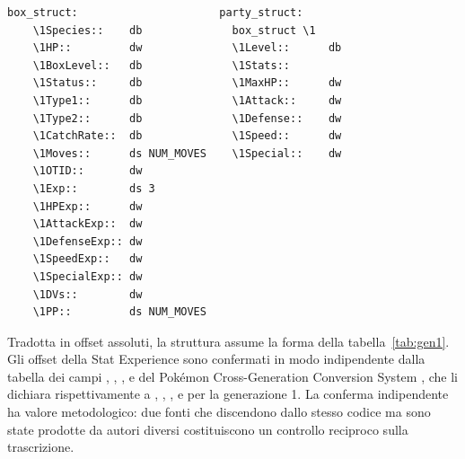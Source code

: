 \begin{verbatim}
box_struct:                      party_struct:
    \1Species::    db              box_struct \1
    \1HP::         dw              \1Level::      db
    \1BoxLevel::   db              \1Stats::
    \1Status::     db              \1MaxHP::      dw
    \1Type1::      db              \1Attack::     dw
    \1Type2::      db              \1Defense::    dw
    \1CatchRate::  db              \1Speed::      dw
    \1Moves::      ds NUM_MOVES    \1Special::    dw
    \1OTID::       dw
    \1Exp::        ds 3
    \1HPExp::      dw
    \1AttackExp::  dw
    \1DefenseExp:: dw
    \1SpeedExp::   dw
    \1SpecialExp:: dw
    \1DVs::        dw
    \1PP::         ds NUM_MOVES
\end{verbatim}

Tradotta in offset assoluti, la struttura assume la forma della tabella~\ref{tab:gen1}. Gli offset della Stat Experience sono confermati in modo indipendente dalla tabella dei campi , , ,  e  del Pokémon Cross-Generation Conversion System \cite{pccs}, che li dichiara rispettivamente a , , ,  e  per la generazione 1. La conferma indipendente ha valore metodologico: due fonti che discendono dallo stesso codice ma sono state prodotte da autori diversi costituiscono un controllo reciproco sulla trascrizione.

